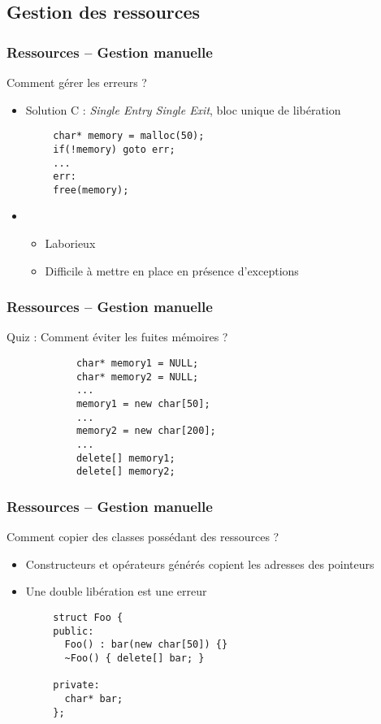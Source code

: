 \documentclass[C++.tex]{subfiles}
\begin{document}
\subsection*{Gestion des ressources}
\begin{frame}[fragile]
	\frametitle{Ressources -- Gestion manuelle}
	\begin{alertblock}{}
		Comment gérer les erreurs ?
	\end{alertblock}

	\begin{itemize}
		\item Solution C : \textit{Single Entry Single Exit}, bloc unique de libération
	\end{itemize}

	\begin{verbatim}
		char* memory = malloc(50);
		if(!memory) goto err;
		...
		err:
		free(memory);
	\end{verbatim}

	\begin{itemize}
	\item []
		\begin{itemize}
			\item Laborieux
			\item Difficile à mettre en place en présence d'exceptions
		\end{itemize}
	\end{itemize}
\end{frame}

\begin{frame}[fragile]
	\frametitle{Ressources -- Gestion manuelle}
	\begin{block}{Quiz : Comment éviter les fuites mémoires ?}
		\begin{verbatim}
			char* memory1 = NULL;
			char* memory2 = NULL;
			...
			memory1 = new char[50];
			...
			memory2 = new char[200];
			...
			delete[] memory1;
			delete[] memory2;
		\end{verbatim}
	\end{block}
\end{frame}

\begin{frame}[fragile]
	\frametitle{Ressources -- Gestion manuelle}
	\begin{alertblock}{}
		Comment copier des classes possédant des ressources ?
	\end{alertblock}

	\begin{itemize}
		\item Constructeurs et opérateurs générés copient les adresses des pointeurs
		\item Une double libération est une erreur
	\end{itemize}

	\begin{verbatim}
		struct Foo {
		public:
		  Foo() : bar(new char[50]) {}
		  ~Foo() { delete[] bar; }

		private:
		  char* bar;
		};
	\end{verbatim}
\end{frame}
\end{document}
